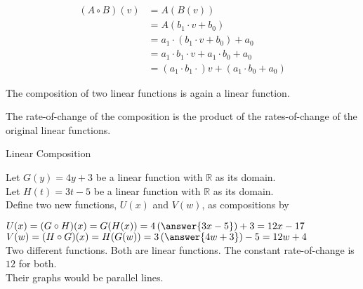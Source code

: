 \documentclass{ximera}
\begin{document}
\begin{align*}
(A \circ B)(v) & = A(B(v)) \\
& = A(b_1 \cdot v + b_0)  \\
& = a_1 \cdot (b_1 \cdot v + b_0) + a_0  \\
& = a_1 \cdot b_1 \cdot v + a_1 \cdot b_0 + a_0    \\
& = (a_1 \cdot b_1 \cdot) v + (a_1 \cdot b_0 + a_0)
\end{align*}






The composition of two linear functions is again a linear function.

The rate-of-change of the composition is the product of the rates-of-change of the original linear functions.





\begin{example} Linear Composition

Let $G(y) = 4 y + 3$ be a linear function with $\mathbb{R}$ as its domain. \\
Let $H(t) = 3 t -5$ be a linear function with $\mathbb{R}$ as its domain. \\


Define two new functions, $U(x)$ and $V(w)$, as compositions by

$U(x) = (G \circ H)(x) = G(H(x)) = 4 \left(\answer{3 x - 5}\right) + 3 = 12 x -17$ \\
$V(w) = (H \circ G)(x) =H(G(w)) = 3 \left(\answer{4 w + 3}\right) - 5 = 12 w + 4$ \\


Two different functions. Both are linear functions. The constant rate-of-change is $12$ for both. \\

Their graphs would be parallel lines. \\


\end{example}
\end{document}
